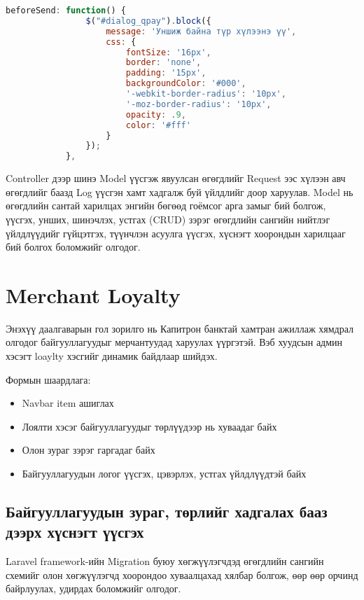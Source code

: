 \begin{lstlisting}[language=Javascript, caption=blockUI ашигласан байдал, frame=single]
	beforeSend: function() {
                $("#dialog_qpay").block({
                    message: 'Уншиж байна түр хүлээнэ үү',
                    css: {
                        fontSize: '16px',
                        border: 'none',
                        padding: '15px',
                        backgroundColor: '#000',
                        '-webkit-border-radius': '10px',
                        '-moz-border-radius': '10px',
                        opacity: .9,
                        color: '#fff'
                    }
                });
            },
\end{lstlisting}
Controller дээр шинэ Model үүсгэж явуулсан өгөгдлийг Request ээс хүлээн авч өгөгдлийг баазд Log үүсгэн хамт хадгалж буй үйлдлийг доор харуулав.
Model нь өгөгдлийн сантай харилцах энгийн бөгөөд гоёмсог арга замыг бий болгож, үүсгэх, унших, шинэчлэх, устгах (CRUD) зэрэг өгөгдлийн сангийн нийтлэг үйлдлүүдийг гүйцэтгэх, түүнчлэн асуулга үүсгэх, хүснэгт хоорондын харилцааг бий болгох боломжийг олгодог.


\section{Merchant Loyalty}

Энэхүү даалгаварын гол зорилго нь Капитрон банктай хамтран ажиллаж хямдрал олгодог байгууллагуудыг мерчантуудад харуулах үүргэтэй. Вэб хуудсын админ хэсэгт loaylty хэсгийг динамик байдлаар шийдэх. 

Формын шаардлага: 
\begin{itemize}
    \item Navbar item ашиглах
    \item Лоялти хэсэг байгууллагуудыг төрлүүдээр нь хуваадаг байх
    \item Олон зураг зэрэг гаргадаг байх
    \item Байгууллагуудын логог үүсгэх, цэвэрлэх, устгах үйлдлүүдтэй байх
\end{itemize}

\subsection{Байгууллагуудын зураг, төрлийг хадгалах бааз дээрх хүснэгт үүсгэх}

Laravel framework-ийн Migration буюу хөгжүүлэгчдэд өгөгдлийн сангийн схемийг олон хөгжүүлэгчд хоорондоо хуваалцахад хялбар болгож, өөр өөр орчинд байрлуулах, удирдах боломжийг олгодог.

